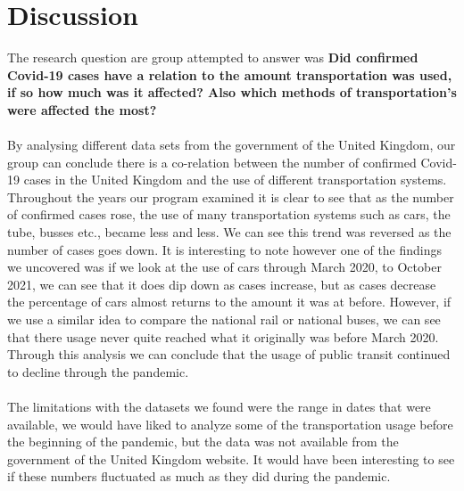 \documentclass[fontsize=11pt]{article}
\begin{document}
\section*{Discussion}

The research question are group attempted to answer was \textbf{Did confirmed Covid-19 cases have a relation to the amount transportation was used, if so how much was it affected? Also which methods of transportation's were affected the most?} \\ \\

By analysing different data sets from the government of the United Kingdom, our group can conclude there is a co-relation between the number of confirmed Covid-19 cases in the United Kingdom and the use of different transportation systems. Throughout the years our program examined it is clear to see that as the number of confirmed cases rose, the use of many transportation systems such as cars, the tube, busses etc., became less and less. We can see this trend was reversed as the number of cases goes down. It is interesting to note however one of the findings we uncovered was if we look at the use of cars through March 2020, to October 2021, we can see that it does dip down as cases increase, but as cases decrease the percentage of cars almost returns to the amount it was at before. However, if we use a similar idea to compare the national rail or national buses, we can see that there usage never quite reached what it originally was before March 2020. Through this analysis we can conclude that the usage of public transit continued to decline through the pandemic. \\ \\

The limitations with the datasets we found were the range in dates that were available, we would have liked to analyze some of the transportation usage before the beginning of the pandemic, but the data was not available from the government of the United Kingdom website. It would have been interesting to see if these numbers fluctuated as much as they did during the pandemic. \\ \\
\end{document}
